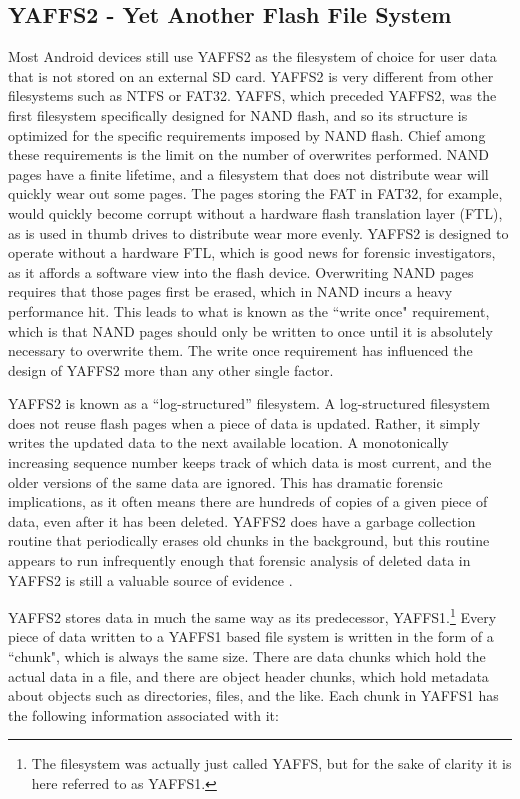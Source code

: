 \subsection{YAFFS2 - Yet Another Flash File System} Most Android devices still use YAFFS2 as the filesystem of choice for user data
that is not stored on an external SD card.  YAFFS2 is very different from other filesystems such as NTFS or FAT32.  YAFFS, which
preceded YAFFS2,  was the first filesystem specifically designed for NAND flash, and so its structure is optimized for the specific
requirements imposed by NAND flash.  Chief among these requirements is the limit on the number of overwrites performed.  NAND pages
have a finite lifetime, and a filesystem that does not distribute wear will quickly wear out some pages.  The pages storing the FAT
in FAT32, for example, would quickly become corrupt without a hardware flash translation layer (FTL), as is used in thumb drives to
distribute wear more evenly.  YAFFS2 is designed to operate without a hardware FTL, which is good news for forensic investigators,
as it affords a software view into the flash device.  Overwriting NAND pages requires that those pages first be erased, which in
NAND incurs a heavy performance hit.  This leads to what is known as the ``write once" requirement, which is that NAND pages should
only be written to once until it is absolutely necessary to overwrite them. The write once requirement has influenced the design of
YAFFS2 more than any other single factor.

YAFFS2 is known as a ``log-structured'' filesystem.  A log-structured filesystem does not reuse flash pages when a piece of data is
updated.  Rather, it simply writes the updated data to the next available location.  A monotonically increasing sequence number
keeps track of which data is most current, and the older versions of the same data are ignored.  This has dramatic forensic
implications, as it often means there are hundreds of copies of a given piece of data, even after it has been deleted.  YAFFS2 does
have a garbage collection routine that periodically erases old chunks in the background, but this routine appears to run
infrequently enough that forensic analysis of deleted data in YAFFS2 is still a valuable source of evidence \cite{naval}. 

YAFFS2 stores data in much the same way as its predecessor, YAFFS1.\footnote{The filesystem was actually
just called YAFFS, but for the sake of clarity it is here referred to as YAFFS1.} Every piece of data written to a YAFFS1 based file
system is written in the form of a ``chunk", which is always the same size.  There are data chunks which hold the actual data in a
file, and there are object header chunks, which hold metadata about objects such as directories, files, and the like.  Each chunk in
YAFFS1 has the following information associated with it:


